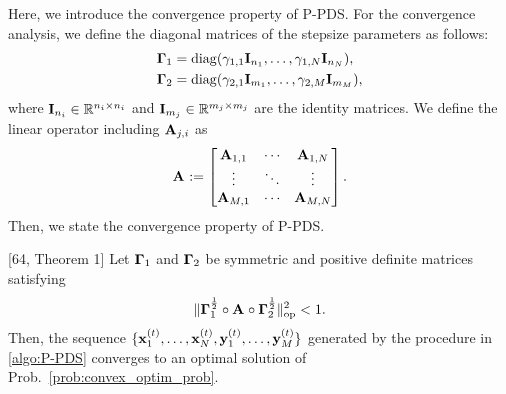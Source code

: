 Here, we introduce the convergence property of P-PDS.
For the convergence analysis, we define the diagonal matrices of the stepsize parameters as follows:
\begin{align}
	\label{eq:StepsizeMatrices}
	\mathbf{\Gamma}_{1} & = \operatorname{diag}(\gamma_{1, 1} \mathbf{I}_{n_{1}}, \ldots, \gamma_{1, N} \mathbf{I}_{n_{N}}), \notag \\
	\mathbf{\Gamma}_{2} & = \operatorname{diag}(\gamma_{2, 1} \mathbf{I}_{m_{1}}, \ldots, \gamma_{2, M} \mathbf{I}_{m_{M}}),
\end{align}
where $\mathbf{I}_{n_{i}} \in \mathbb{R}^{n_{i} \times n_{i}}$ and $\mathbf{I}_{m_{j}} \in \mathbb{R}^{m_{j} \times m_{j}}$ are the identity matrices. We define the linear operator including $\mathbf{A}_{j,i}$ as
\begin{equation}
	\label{eq:LinearOperator}
	\mathbf{A}_{} := 
	\begin{bmatrix}
		\mathbf{A}_{1, 1} & \cdots & \mathbf{A}_{1, N} \\
		\vdots & \ddots & \vdots \\
		\mathbf{A}_{M, 1} & \cdots & \mathbf{A}_{M, N}
	\end{bmatrix}.
\end{equation}
Then, we state the convergence property of P-PDS.
\begin{thm}
	\label{thm:ConvergenceP-PDS}
	[64, Theorem 1] Let $\mathbf{\Gamma}_{1}$ and $\mathbf{\Gamma}_{2}$ be symmetric and positive definite matrices satisfying
	\begin{equation}
		\label{ieq:ConvergenceCondition}
		\| \mathbf{\Gamma}_{1}^{\frac{1}{2}} \circ \mathbf{A}_{} \circ \mathbf{\Gamma}_{2}^{\frac{1}{2}} \|_{\mathrm{op}}^{2} < 1.
	\end{equation}
	Then, the sequence $\lbrace \mathbf{x}_{1}^{(t)}, \ldots, \mathbf{x}_{N}^{(t)}, \mathbf{y}_{1}^{(t)}, \ldots, \mathbf{y}_{M}^{(t)} \rbrace$ generated by the procedure in \eqref{algo:P-PDS} converges to an optimal solution of Prob.~\eqref{prob:convex_optim_prob}.
\end{thm}

